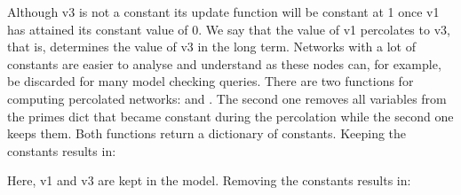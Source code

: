 \documentclass[letterpaper,10pt,english]{sphinxmanual}
\begin{document}
Although v3 is not a constant its update function will be constant at 1 once v1 has attained its constant value of 0.
We say that the value of v1 percolates to v3, that is, determines the value of v3 in the long term.
Networks with a lot of constants are easier to analyse and understand as these nodes can, for example, be discarded for many model checking queries.
There are two functions for computing percolated networks:
{\hyperref[\detokenize{PrimeImplicants:percolate-and-keep-constants}]{}} and {\hyperref[\detokenize{PrimeImplicants:percolate-and-remove-constants}]{}}.
The second one removes all variables from the primes dict that became constant during the percolation while the second one keeps them.
Both functions return a dictionary of constants.
Keeping the constants results in:

\begin{sphinxVerbatim}[commandchars=\\\{\}]
  
  
\end{sphinxVerbatim}

Here, v1 and v3 are kept in the model.
Removing the constants results in:

\begin{sphinxVerbatim}[commandchars=\\\{\}]
  
  
\end{sphinxVerbatim}
\end{document}
